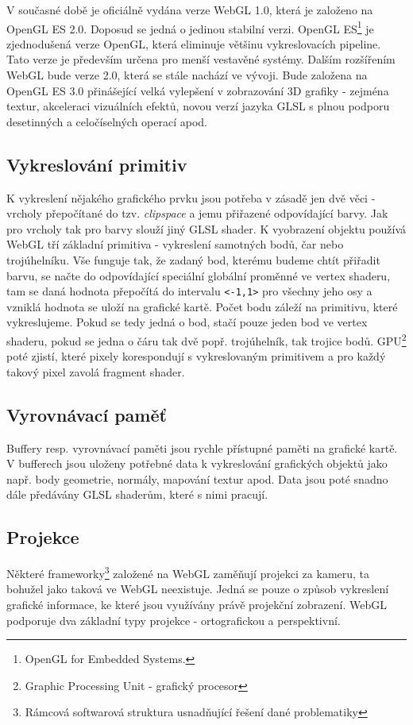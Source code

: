V současné době je oficiálně vydána verze WebGL 1.0, která je založeno na OpenGL ES 2.0. Doposud se jedná o jedinou stabilní verzi. OpenGL ES\footnote{OpenGL for Embedded Systems.} je zjednodušená verze OpenGL, která eliminuje většinu vykreslovacích pipeline. Tato verze je především určena pro menší vestavěné systémy. Dalším rozšířením WebGL bude verze 2.0, která se stále nachází ve vývoji. Bude založena na OpenGL ES 3.0 přinášející velká vylepšení v zobrazování 3D grafiky - zejména textur, akceleraci vizuálních efektů, novou verzí jazyka GLSL s plnou podporu desetinných a celočíselných operací apod.



\subsection{Vykreslování primitiv}
K vykreslení nějakého grafického prvku jsou potřeba v zásadě jen dvě věci - vrcholy přepočítané do tzv. \textit{clipspace} a jemu přiřazené odpovídající barvy. Jak pro vrcholy tak pro barvy slouží jiný GLSL shader. K vyobrazení objektu používá WebGL tří základní primitiva - vykreslení samotných bodů, čar nebo trojúhelníku. Vše funguje tak, že zadaný bod, kterému budeme chtít přiřadit barvu, se načte do odpovídající speciální globální proměnné ve vertex shaderu, tam se daná hodnota přepočítá do intervalu \texttt{<-1,1>} pro všechny jeho osy a vzniklá hodnota se uloží na grafické kartě. Počet bodu záleží na primitivu, které vykreslujeme. Pokud se tedy jedná o bod, stačí pouze jeden bod ve vertex shaderu, pokud se jedna o čáru tak dvě popř. trojúhelník, tak trojice bodů. GPU\footnote{Graphic Processing Unit - grafický procesor} poté zjistí, které pixely korespondují s vykreslovaným primitivem a pro každý takový pixel zavolá fragment shader. 


\subsection{Vyrovnávací paměť}
Buffery resp. vyrovnávací paměti jsou rychle přístupné paměti na grafické kartě. V bufferech jsou  uloženy potřebné data k vykreslování grafických objektů jako např. body geometrie, normály, mapování textur apod. Data jsou poté snadno dále předávány GLSL shaderům, které s nimi pracují.


\newpage

\subsection{Projekce}
Některé frameworky\footnote{Rámcová softwarová struktura usnadňující řešení dané problematiky} založené na WebGL zaměňují projekci za kameru, ta bohužel jako taková ve WebGL neexistuje. Jedná se pouze o způsob vykreslení grafické informace, ke které jsou využívány právě projekční zobrazení. WebGL podporuje dva základní typy projekce - ortografickou a perspektivní. 

